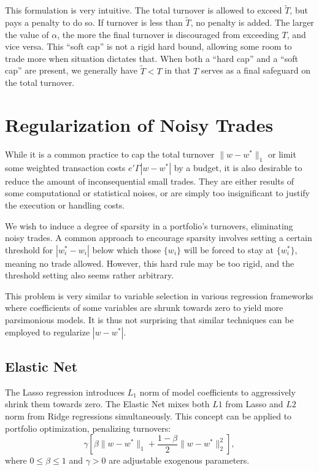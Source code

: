 \documentclass[11pt, letterpaper]{article}
\begin{document}
This formulation is very intuitive. The total turnover is allowed to exceed $\tilde{T}$, but pays a penalty to do so. If
turnover is less than $\tilde{T}$, no penalty is added. The larger the value of $\alpha$, the more the final turnover is
discouraged from exceeding $T$, and vice versa. This ``soft cap'' is not a rigid hard bound, allowing some room to trade more
when situation dictates that. When both a ``hard cap'' and a ``soft cap'' are present, we generally have $\tilde{T} < T$ in
that $T$ serves as a final safeguard on the total turnover.

\section{Regularization of Noisy Trades}

While it is a common practice to cap the total turnover $\lVert w - w^*\rVert_1$ or limit some weighted transaction costs
$e'\Gamma |w - w^*|$ by a budget, it is also desirable to reduce the amount of inconsequential small trades. They are either
results of some computational or statistical noises, or are simply too insignificant to justify the execution or handling
costs.

We wish to induce a degree of sparsity in a portfolio's turnovers, eliminating noisy trades. A common approach to encourage
sparsity involves setting a certain threshold for $\left |w^*_i - w_i \right|$ below which those $\{w_i\}$ will be forced to
stay at $\{w_i^*\}$, meaning no trade allowed. However, this hard rule may be too rigid, and the threshold setting also seems
rather arbitrary.

This problem is very similar to variable selection in various regression frameworks where coefficients of some variables are
shrunk towards zero to yield more parsimonious models. It is thus not surprising that similar techniques can be employed to
regularize $|w - w^*|$.
\subsection{Elastic Net}

The Lasso regression \cite{tibshirani1996lasso} introduces $L_1$ norm of model coefficients to aggressively shrink them towards
zero. The Elastic Net \cite{zou2005elasticnet} mixes both $L1$ from Lasso and $L2$ norm from Ridge regressions
simultaneously. This concept can be applied to portfolio optimization, penalizing turnovers:
\begin{equation}
	\label{elastic_net_objective}
	\gamma\left[\beta \lVert w-w^*\rVert_1 + \frac{1 - \beta}{2} \lVert w-w^*\rVert_2^2\right],
\end{equation}
where $0 \leq \beta \leq 1$ and $\gamma > 0$ are adjustable exogenous parameters.
\end{document}
